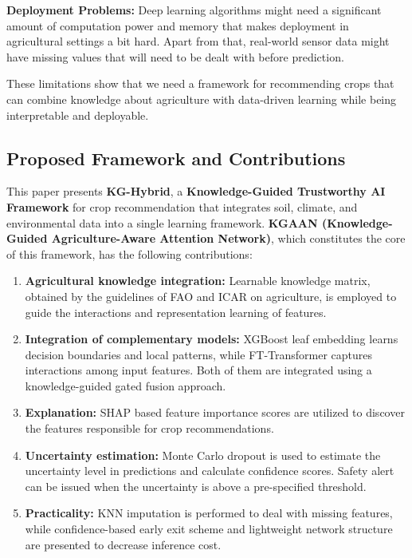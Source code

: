 \documentclass[journal]{IEEEtran}
\begin{document}
\textbf{Deployment Problems:}
Deep learning algorithms might need a significant amount of computation power and memory that makes deployment in agricultural settings a bit hard. Apart from that, real-world sensor data might have missing values that will need to be dealt with before prediction.

These limitations show that we need a framework for recommending crops that can combine knowledge about agriculture with data-driven learning while being interpretable and deployable.

\subsection{Proposed Framework and Contributions}

This paper presents \textbf{KG-Hybrid}, a \textbf{Knowledge-Guided Trustworthy AI Framework} for crop recommendation that integrates soil, climate, and environmental data into a single learning framework. \textbf{KGAAN (Knowledge-Guided Agriculture-Aware Attention Network)}, which constitutes the core of this framework, has the following contributions:

\begin{enumerate}
    \item \textbf{Agricultural knowledge integration:} Learnable knowledge matrix, obtained by the guidelines of FAO and ICAR on agriculture, is employed to guide the interactions and representation learning of features.

    \item \textbf{Integration of complementary models:} XGBoost leaf embedding learns decision boundaries and local patterns, while FT-Transformer captures interactions among input features. Both of them are integrated using a knowledge-guided gated fusion approach.

    \item \textbf{Explanation:} SHAP based feature importance scores are utilized to discover the features responsible for crop recommendations.

    \item \textbf{Uncertainty estimation:} Monte Carlo dropout is used to estimate the uncertainty level in predictions and calculate confidence scores. Safety alert can be issued when the uncertainty is above a pre-specified threshold.

    \item \textbf{Practicality:} KNN imputation is performed to deal with missing features, while confidence-based early exit scheme and lightweight network structure are presented to decrease inference cost.
\end{enumerate}
\end{document}
